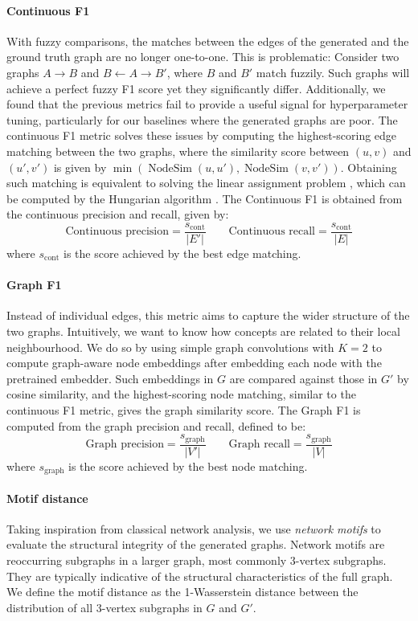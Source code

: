 \documentclass{article}
\DeclareMathOperator{\nodesim}{NodeSim}
\begin{document}
\paragraph{Continuous F1}
With fuzzy comparisons, the matches between the edges of the generated and the ground truth graph are no longer one-to-one. This is problematic: Consider two graphs $A \rightarrow B$ and $B \leftarrow A \rightarrow B'$, where $B$ and $B'$ match fuzzily. Such graphs will achieve a perfect fuzzy F1 score yet they significantly differ. Additionally, we found that the previous metrics fail to provide a useful signal for hyperparameter tuning, particularly for our baselines where the generated graphs are poor. The continuous F1 metric solves these issues by computing the highest-scoring edge matching between the two graphs, where the similarity score between $(u, v)$ and $(u', v')$ is given by $\min(\nodesim(u, u'), \nodesim(v, v'))$. Obtaining such matching is equivalent to solving the linear assignment problem \cite{martello1987linear}, which can be computed by the Hungarian algorithm \cite{kuhn1955hungarian}. The Continuous F1 is obtained from the continuous precision and recall, given by:
\[
\text{Continuous precision} = \frac{s_\text{cont}}{|E'|} \qquad
\text{Continuous recall} = \frac{s_\text{cont}}{|E|}
\]
where $s_\text{cont}$ is the score achieved by the best edge matching.

\paragraph{Graph F1}
Instead of individual edges, this metric aims to capture the wider structure of the two graphs. Intuitively, we want to know how concepts are related to their local neighbourhood. We do so by using simple graph convolutions \cite{wu2019simplifying} with $K=2$ to compute graph-aware node embeddings after embedding each node with the pretrained embedder. Such embeddings in $G$ are compared against those in $G'$ by cosine similarity, and the highest-scoring node matching, similar to the continuous F1 metric, gives the graph similarity score. The Graph F1 is computed from the graph precision and recall, defined to be:
\[
\text{Graph precision} = \frac{s_\text{graph}}{|V'|} \qquad
\text{Graph recall} = \frac{s_\text{graph}}{|V|}
\]
where $s_\text{graph}$ is the score achieved by the best node matching.

\paragraph{Motif distance}
Taking inspiration from classical network analysis, we use \emph{network motifs} \cite{milo2002network,shen2002network} to evaluate the structural integrity of the generated graphs. Network motifs are reoccurring subgraphs in a larger graph, most commonly 3-vertex subgraphs. They are typically indicative of the structural characteristics of the full graph. We define the motif distance as the 1-Wasserstein distance between the distribution of all 3-vertex subgraphs in $G$ and $G'$.
\end{document}
